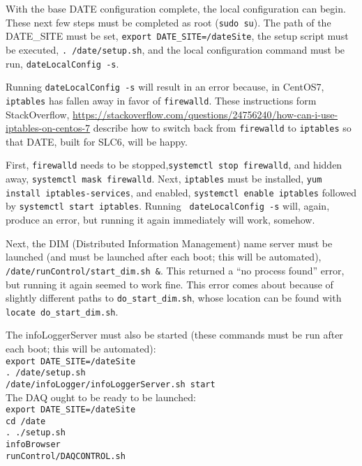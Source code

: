 \documentclass[12pt]{article}
\begin{document}
\qq With the base DATE configuration complete, the local configuration can
begin. These next few steps must be completed as root ({\tt sudo su}). The path
of the DATE\_SITE must be set, {\tt export DATE\_SITE=/dateSite}, the setup script
must be executed, {\tt . /date/setup.sh}, and the local configuration command
must be run, {\tt dateLocalConfig -s}.

\qq Running {\tt dateLocalConfig -s} will result in an error because, in
CentOS7, {\tt iptables} has fallen away in favor of {\tt firewalld}. These
instructions form StackOverflow,
\url{https://stackoverflow.com/questions/24756240/how-can-i-use-iptables-on-centos-7}
describe how to switch back from {\tt firewalld} to {\tt iptables} so that DATE,
built for SLC6, will be happy.

\qq First, {\tt firewalld} needs to be stopped,{\tt systemctl stop firewalld},
and hidden away, {\tt systemctl mask firewalld}. Next, {\tt iptables} must be
installed, {\tt yum install iptables-services}, and enabled, {\tt systemctl
  enable iptables} followed by {\tt systemctl start iptables}. Running {\tt
  dateLocalConfig -s} will, again, produce an error, but running it again
immediately will work, somehow.

\qq Next, the DIM (Distributed Information Management) name server must be
launched (and must be launched after each boot; this will be automated), {\tt
  /date/runControl/start\_dim.sh \&}. This returned a ``no process found'' error,
but running it again seemed to work fine. This error comes about because of
slightly different paths to {\tt do\_start\_dim.sh}, whose location can be found
with {\tt locate do\_start\_dim.sh}.

\qq The infoLoggerServer must also be started (these commands must be run after
each boot; this will be automated):\\
{\tt export DATE\_SITE=/dateSite} \\
{\tt . /date/setup.sh} \\
{\tt /date/infoLogger/infoLoggerServer.sh start} \\

\qq The DAQ ought to be ready to be launched:\\
{\tt export DATE\_SITE=/dateSite}\\
{\tt cd /date} \\
{\tt . ./setup.sh}\\
{\tt infoBrowser}\\
{\tt runControl/DAQCONTROL.sh}\\
\end{document}
